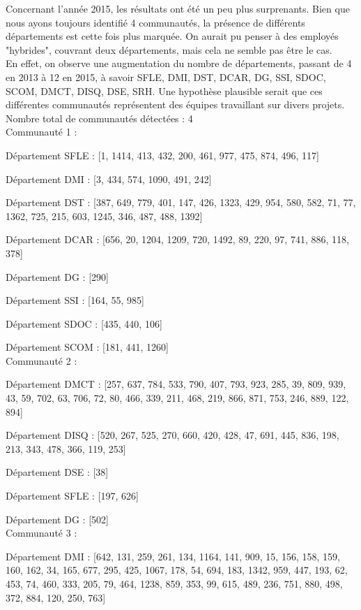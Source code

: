 \documentclass{article}
\begin{document}
Concernant l'année 2015, les résultats ont été un peu plus surprenants. Bien que nous ayons toujours identifié 4 communautés, la présence de différents départements est cette fois plus marquée. On aurait pu penser à des employés "hybrides", couvrant deux départements, mais cela ne semble pas être le cas. \\

En effet, on observe une augmentation du nombre de départements, passant de 4 en 2013 à 12 en 2015, à savoir SFLE, DMI, DST, DCAR, DG, SSI, SDOC, SCOM, DMCT, DISQ, DSE, SRH. Une hypothèse plausible serait que ces différentes communautés représentent des équipes travaillant sur divers projets. \\

Nombre total de communautés détectées : 4 \\

Communauté 1 :

Département SFLE : [1, 1414, 413, 432, 200, 461, 977, 475, 874, 496, 117]

Département DMI : [3, 434, 574, 1090, 491, 242]

Département DST : [387, 649, 779, 401, 147, 426, 1323, 429, 954, 580, 582, 71, 77, 1362, 725, 215, 603, 1245, 346, 487, 488, 1392]

Département DCAR : [656, 20, 1204, 1209, 720, 1492, 89, 220, 97, 741, 886, 118, 378]

Département DG : [290]

Département SSI : [164, 55, 985]

Département SDOC : [435, 440, 106]

Département SCOM : [181, 441, 1260] \\

Communauté 2 :

Département DMCT : [257, 637, 784, 533, 790, 407, 793, 923, 285, 39, 809, 939, 43, 59, 702, 63, 706, 72, 80, 466, 339, 211, 468, 219, 866, 871, 753, 246, 889, 122, 894]

Département DISQ : [520, 267, 525, 270, 660, 420, 428, 47, 691, 445, 836, 198, 213, 343, 478, 366, 119, 253]

Département DSE : [38]

Département SFLE : [197, 626]

Département DG : [502] \\

Communauté 3 :

Département DMI : [642, 131, 259, 261, 134, 1164, 141, 909, 15, 156, 158, 159, 160, 162, 34, 165, 677, 295, 425, 1067, 178, 54, 694, 183, 1342, 959, 447, 193, 62, 453, 74, 460, 333, 205, 79, 464, 1238, 859, 353, 99, 615, 489, 236, 751, 880, 498, 372, 884, 120, 250, 763]
\end{document}
